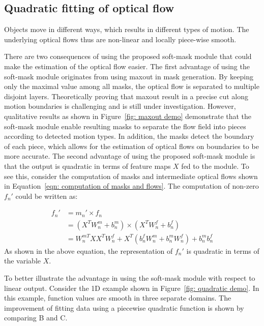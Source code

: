 \documentclass[10pt,twocolumn,letterpaper]{article}
\begin{document}
\subsection{Quadratic fitting of optical flow}
Objects move in different ways, which results in different types of motion. The underlying optical flows thus are non-linear and locally piece-wise smooth. 

There are two consequences of using the proposed soft-mask module that could make the estimation of the optical flow easier. The first advantage of using the soft-mask module originates from using maxout in mask generation. By keeping only the maximal value among all masks, the optical flow is separated to multiple disjoint layers. Theoretically proving that maxout result in a precise cut along motion boundaries is challenging and is still under investigation. However, qualitative results as shown in Figure~\ref{fig: maxout demo} demonstrate that the soft-mask module enable resulting masks to separate the flow field into pieces according to detected motion types. In addition, the masks detect the boundary of each piece, which allows for the estimation of optical flows on boundaries to be more accurate.  The second advantage of using the proposed soft-mask module is that the output is quadratic in terms of feature maps $X$ fed to the module. To see this, consider the computation of masks and intermediate optical flows shown in Equation~\ref{eqn: computation of masks and flows}. The computation of non-zero $f_n'$ could be written as:

\begin{align}
f_n' & = m_n' \times f_n \nonumber\\
	 & = (X^T W_n^m + b_n^m) \times (X^T W_n^f + b_n^f) \nonumber\\
	 & = W_n^{mT} X X^T W_n^f + X^T(b_n^f W_n^m + b_n^m W_n^f) + b_n^m b_n^f
\end{align}
As shown in the above equation, the representation of $f_n'$ is quadratic in terms of the variable $X$.

To better illustrate the advantage in using the soft-mask module with respect to linear output. Consider the 1D example shown in Figure~\ref{fig: quadratic demo}. In this example, function values are smooth in three separate domains. The improvement of fitting data using a piecewise quadratic function is shown by comparing B and C.
\end{document}
